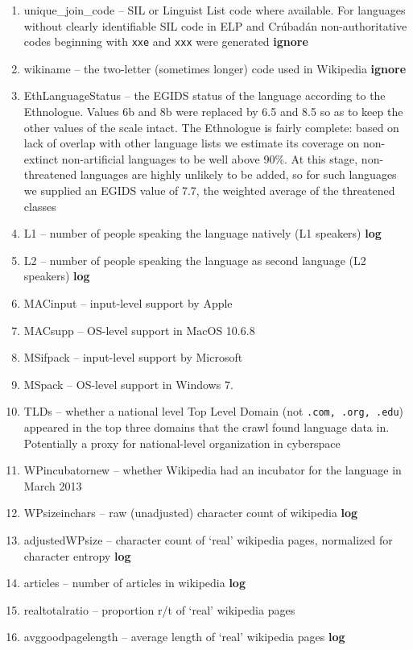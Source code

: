 \documentclass[10pt]{article}
\begin{document}
\noindent\begin{enumerate}
\item unique\_join\_code -- SIL or Linguist List code where available.  For
  languages without clearly identifiable SIL code in ELP and Cr\'ubad\'an
  non-authoritative codes beginning with {\tt xxe} and {\tt xxx} were
  generated {\bf ignore}
\item wikiname -- the two-letter (sometimes longer) code used in Wikipedia {\bf ignore} 
\item EthLanguageStatus -- the EGIDS status of the language according to the
  Ethnologue. Values 6b and 8b were replaced by 6.5 and 8.5 so as to keep the
  other values of the scale intact. The Ethnologue is fairly complete: based on
  lack of overlap with other language lists we estimate its coverage on
  non-extinct non-artificial languages to be well above 90\%. At this stage,
  non-threatened languages are highly unlikely to be added, so for such
  languages we supplied an EGIDS value of 7.7, the weighted average of the
  threatened classes
\item L1 -- number of people speaking the language natively (L1
  speakers) {\bf log}
\item L2 -- number of people speaking the language as second language (L2
  speakers) {\bf log}
\item MACinput -- input-level support by Apple
\item MACsupp -- OS-level support in MacOS 10.6.8
\item MSifpack -- input-level support by Microsoft
\item MSpack -- OS-level support in Windows 7.
\item TLDs -- whether a national level Top Level Domain (not {\tt .com, .org,
  .edu}) appeared in the top three domains that the crawl found language data
  in. Potentially a proxy for national-level organization in cyberspace 
\item WPincubatornew -- whether Wikipedia had an incubator for the language in
  March 2013
\item WPsizeinchars -- raw (unadjusted) character count of wikipedia {\bf log}
\item adjustedWPsize -- character count of `real' wikipedia pages, normalized
  for character entropy {\bf log}
\item articles -- number of articles in wikipedia {\bf log}
\item realtotalratio -- proportion r/t of `real' wikipedia pages
\item avggoodpagelength -- average length of `real' wikipedia pages {\bf log}

\end{enumerate}
\end{document}
